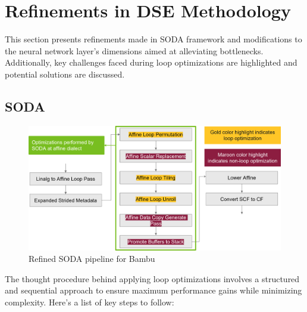 \clearpage
\section{Refinements in DSE Methodology}

This section presents refinements made in SODA framework and modifications to the neural network layer's dimensions aimed at alleviating bottlenecks. Additionally, key challenges faced during loop optimizations are highlighted and potential solutions are discussed.

\subsection{SODA}

\begin{figure}[H]
    \centering
    \includegraphics[width=1\linewidth]{figure//chapter3_implementation/Figure 5 - refined soda.png}
    \caption{Refined SODA pipeline for Bambu}
    \label{fig:refinedSODA}
\end{figure}

The thought procedure behind applying loop optimizations involves a structured and sequential approach to ensure maximum performance gains while minimizing complexity. Here's a list of key steps to follow:

